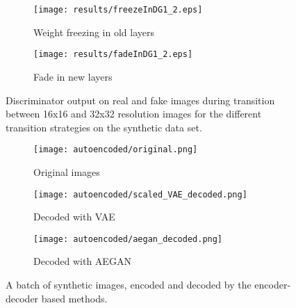 \begin{figure}[t]
    \centering
    \begin{subfigure}[b]{0.49\textwidth}
        \texttt{[image: results/freezeInDG1\_2.eps]}
        \caption{Weight freezing in old layers}
        \label{fig:freezeInDG1}
    \end{subfigure}
    \begin{subfigure}[b]{0.49\textwidth}
        \texttt{[image: results/fadeInDG1\_2.eps]}
        \caption{Fade in new layers}
        \label{fig:freezeInDG2}
    \end{subfigure}
    \caption{Discriminator output on real and fake images during transition between 16x16 and 32x32 resolution images for the different transition strategies on the synthetic data set.}
    \label{fig:fadeVsFreeze}
\end{figure}

\begin{figure}[t]
    \centering
    \begin{subfigure}[b]{\textwidth}
        \texttt{[image: autoencoded/original.png]}
        \caption{Original images}
        \label{fig:stuff}
    \end{subfigure}
    \begin{subfigure}[b]{\textwidth}
        \texttt{[image: autoencoded/scaled\_VAE\_decoded.png]}
        \caption{Decoded with VAE}
        \label{fig:stuff}
    \end{subfigure}
    \begin{subfigure}[b]{\textwidth}
        \texttt{[image: autoencoded/aegan\_decoded.png]}
        \caption{Decoded with AEGAN}
        \label{fig:stuff}
    \end{subfigure}
    \caption{A batch of synthetic images, encoded and decoded by the encoder-decoder based methods.}
    \label{fig:autoencoders}
\end{figure}

